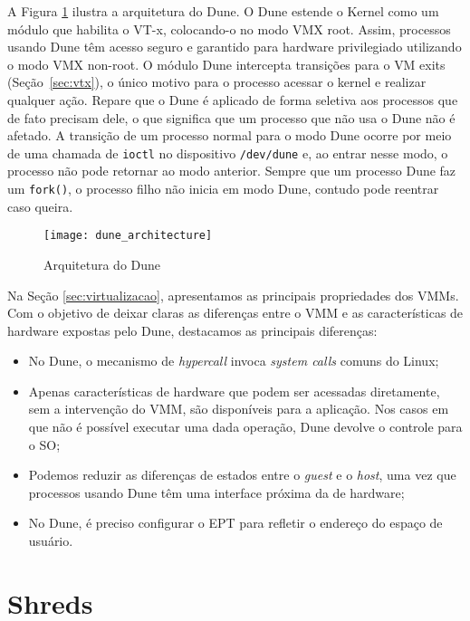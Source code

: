 A Figura \ref{fig:dune_architecture} ilustra a arquitetura do Dune. O Dune
estende o Kernel como um módulo que habilita o VT-x, colocando-o no
modo VMX root. Assim, processos usando Dune têm acesso seguro e garantido para
hardware privilegiado utilizando o modo VMX non-root. O módulo Dune intercepta
transições para o {VM exits} (Seção~\ref{sec:vtx}), o único motivo para o
processo acessar o kernel e realizar qualquer ação. Repare que o Dune é
aplicado de forma seletiva aos processos que de fato precisam dele, o que
significa que um processo que não usa o Dune não é afetado. A transição de um
processo normal para o modo Dune ocorre por meio de uma chamada de
\texttt{ioctl} no dispositivo \texttt{/dev/dune} e, ao entrar nesse modo, o
processo não pode retornar ao modo anterior. Sempre que um processo Dune faz um
\texttt{fork()}, o processo filho não inicia em modo Dune, contudo pode
reentrar caso queira.

\begin{figure}[!h]
  \centering
  \texttt{[image: dune\_architecture]} 
	\caption[Arquitetura do Dune]{Arquitetura do Dune~\citep{belay}}
  \label{fig:dune_architecture}
\end{figure}

Na Seção \ref{sec:virtualizacao}, apresentamos as principais propriedades dos VMMs.
Com o objetivo de deixar claras as diferenças entre o VMM e as características
de hardware expostas pelo Dune, destacamos as principais diferenças:

\begin{itemize}
  \item No Dune, o mecanismo de \textit{hypercall} invoca
        \textit{system calls} comuns do Linux;
  \item Apenas características de hardware que podem ser acessadas diretamente,
        sem a intervenção do VMM, são disponíveis para a aplicação. Nos casos em
        que não é possível executar uma dada operação, Dune devolve o controle
        para o SO;
  \item Podemos reduzir as diferenças de estados entre o \textit{guest} e o \textit{host}, uma
        vez que processos usando Dune têm uma interface próxima da de hardware;
  \item No Dune, é preciso configurar o EPT para refletir o endereço do espaço
        de usuário.
\end{itemize}

\section{Shreds}

